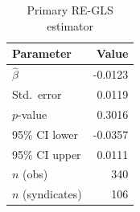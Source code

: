 \begin{table}[htbp]
\centering
\caption{Primary RE-GLS estimator}
\label{tab:primary_re_gls}
\begin{tabular}{lr}
\toprule
\textbf{Parameter} & \textbf{Value} \\
\midrule
$\hat{\beta}$ & -0.0123 \\
Std.\ error & 0.0119 \\
$p$-value & 0.3016 \\
95\% CI lower & -0.0357 \\
95\% CI upper & 0.0111 \\
$n$ (obs) & 340 \\
$n$ (syndicates) & 106 \\
\bottomrule
\end{tabular}
\end{table}
